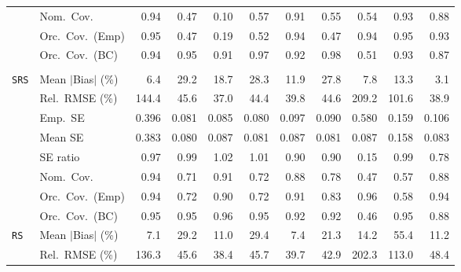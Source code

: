 \begin{landscape}
\begin{longtable}{llrrrrrrrrr}
 & Nom.\ Cov. & \cellcolor{rankone}0.94 & 0.47 & 0.10 & 0.57 & \cellcolor{rankthree}0.91 & 0.55 & 0.54 & \cellcolor{ranktwo}0.93 & 0.88 \\
 & Orc.\ Cov.\ (Emp) & \cellcolor{rankone}0.95 & 0.47 & 0.19 & 0.52 & \cellcolor{ranktwo}0.94 & 0.47 & \cellcolor{ranktwo}0.94 & \cellcolor{rankone}0.95 & \cellcolor{rankthree}0.93 \\
 & Orc.\ Cov.\ (BC) & \cellcolor{rankone}0.94 & \cellcolor{rankone}0.95 & 0.91 & \cellcolor{ranktwo}0.97 & \cellcolor{rankthree}0.92 & \cellcolor{rankthree}0.98 & 0.51 & \cellcolor{ranktwo}0.93 & 0.87 \\
\addlinespace[2pt]
\multicolumn{11}{l}{\textbf{Binary \& Categorical Phase-One Covariates}} \\
\addlinespace[2pt]
\quad \texttt{SRS} & Mean $|$Bias$|$ (\%) & \cellcolor{ranktwo}6.4 & 29.2 & 18.7 & 28.3 & 11.9 & 27.8 & \cellcolor{rankthree}7.8 & 13.3 & \cellcolor{rankone}3.1 \\
 & Rel.\ RMSE (\%) & 144.4 & 45.6 & \cellcolor{rankone}37.0 & 44.4 & \cellcolor{rankthree}39.8 & 44.6 & 209.2 & 101.6 & \cellcolor{ranktwo}38.9 \\
 & Emp.\ SE & 0.396 & 0.081 & 0.085 & 0.080 & 0.097 & 0.090 & 0.580 & 0.159 & 0.106 \\
 & Mean SE & 0.383 & 0.080 & 0.087 & 0.081 & 0.087 & 0.081 & 0.087 & 0.158 & 0.083 \\
 & SE ratio & \cellcolor{rankthree}0.97 & \cellcolor{rankone}0.99 & \cellcolor{ranktwo}1.02 & \cellcolor{rankone}1.01 & 0.90 & 0.90 & 0.15 & \cellcolor{rankone}0.99 & 0.78 \\
 & Nom.\ Cov. & \cellcolor{rankone}0.94 & 0.71 & \cellcolor{ranktwo}0.91 & 0.72 & \cellcolor{rankthree}0.88 & 0.78 & 0.47 & 0.57 & \cellcolor{rankthree}0.88 \\
 & Orc.\ Cov.\ (Emp) & \cellcolor{rankone}0.94 & 0.72 & \cellcolor{rankthree}0.90 & 0.72 & \cellcolor{ranktwo}0.91 & 0.83 & \cellcolor{rankone}0.96 & 0.58 & \cellcolor{rankone}0.94 \\
 & Orc.\ Cov.\ (BC) & \cellcolor{rankone}0.95 & \cellcolor{rankone}0.95 & \cellcolor{ranktwo}0.96 & \cellcolor{rankone}0.95 & \cellcolor{rankthree}0.92 & \cellcolor{rankthree}0.92 & 0.46 & \cellcolor{rankone}0.95 & 0.88 \\
\addlinespace[2pt]
\quad \texttt{RS} & Mean $|$Bias$|$ (\%) & \cellcolor{rankone}7.1 & 29.2 & \cellcolor{rankthree}11.0 & 29.4 & \cellcolor{ranktwo}7.4 & 21.3 & 14.2 & 55.4 & 11.2 \\
 & Rel.\ RMSE (\%) & 136.3 & 45.6 & \cellcolor{rankone}38.4 & 45.7 & \cellcolor{ranktwo}39.7 & \cellcolor{rankthree}42.9 & 202.3 & 113.0 & 48.4 \\

\end{longtable}
\end{landscape}
